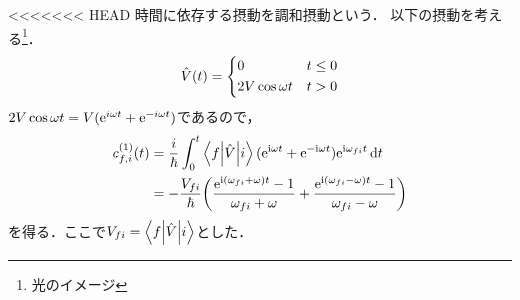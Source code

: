\documentclass{report}
\begin{document}
<<<<<<< HEAD
  時間に依存する摂動を調和摂動という．
  以下の摂動を考える\footnote{光のイメージ}．
  \begin{align}
    \hat{V}(t) = 
    \begin{dcases}
      0 & t\leq 0 \\
      2V\cos\omega t & t > 0
    \end{dcases}
  \end{align}
  $2V\cos\omega t = V(\mathrm{e}^{i\omega t} + \mathrm{e}^{-i\omega t})$であるので，
  \begin{align}
    c^{(1)}_{f, i}(t) &= \frac{i}{\hbar}\int_{0}^{t}\mel**{f}{\hat{V}}{i}(\mathrm{e}^{\mathrm{i}\omega t} + \mathrm{e}^{-\mathrm{i}\omega t})\mathrm{e}^{\mathrm{i}\omega_{fi}t}\dd{t} \label{3.6} \\
    &= -\frac{V_{fi}}{\hbar}\qty(\frac{\mathrm{e}^{\mathrm{i}(\omega_{fi} + \omega)t} - 1}{\omega_{fi} + \omega} + \frac{\mathrm{e}^{\mathrm{i}(\omega_{fi} - \omega)t} - 1}{\omega_{fi} - \omega})
  \end{align}
  を得る．ここで$V_{fi} = \mel**{f}{\hat{V}}{i}$とした．
\end{document}
